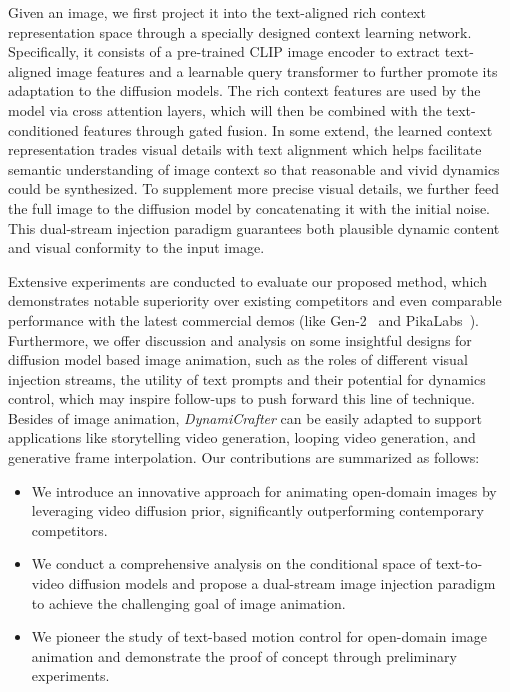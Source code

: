 Given an image, we first project it into the text-aligned rich context representation space through a specially designed context learning network. Specifically, it consists of a pre-trained CLIP image encoder to extract text-aligned image features and a learnable query transformer to further promote its adaptation to the diffusion models. The rich context features are used by the model via cross attention layers, which will then be combined with the text-conditioned features through gated fusion.
In some extend, the learned context representation trades visual details with text alignment which helps facilitate semantic understanding of image context so that reasonable and vivid dynamics could be synthesized. To supplement more precise visual details, we further feed the full image to the diffusion model by concatenating it with the initial noise. This dual-stream injection paradigm guarantees both plausible dynamic content and visual conformity to the input image.

Extensive experiments are conducted to evaluate our proposed method, which demonstrates notable superiority over existing competitors and even comparable performance with the latest commercial demos (like Gen-2~\cite{Gen-2} and PikaLabs~\cite{PikaLabs}). Furthermore, we offer discussion and analysis on some insightful designs for diffusion model based image animation, such as the roles of different visual injection streams, the utility of text prompts and their potential for dynamics control, which may inspire follow-ups to push forward this line of technique.
Besides of image animation, \textit{DynamiCrafter} can be easily adapted to support applications like storytelling video generation, looping video generation, and generative frame interpolation.
Our contributions are summarized as follows:
\begin{itemize}
\itemindent=5pt
    \item We introduce an innovative approach for animating open-domain images by leveraging video diffusion prior, significantly outperforming contemporary competitors.
    \item We conduct a comprehensive analysis on the conditional space of text-to-video diffusion models and propose a dual-stream image injection paradigm to achieve the challenging goal of image animation.
    \item We pioneer the study of text-based motion control for open-domain image animation and demonstrate the proof of concept through preliminary experiments.
\end{itemize}
